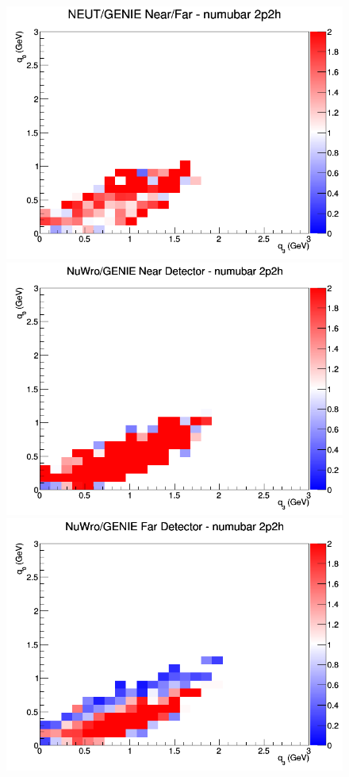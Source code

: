 \begin{figure}[h]
\endminipage
{}
\includegraphics[width=\linewidth]{eff_q0_q3/FGT/ratios/2p2h_NEUT_GENIE_numubar_NF_q3_q0.png}
\endminipage
\newline
{}
\includegraphics[width=\linewidth]{eff_q0_q3/FGT/ratios/2p2h_NuWro_GENIE_numubar_near_q3_q0.png}
\endminipage
{}
\includegraphics[width=\linewidth]{eff_q0_q3/FGT/ratios/2p2h_NuWro_GENIE_numubar_far_q3_q0.png}

\end{figure}
